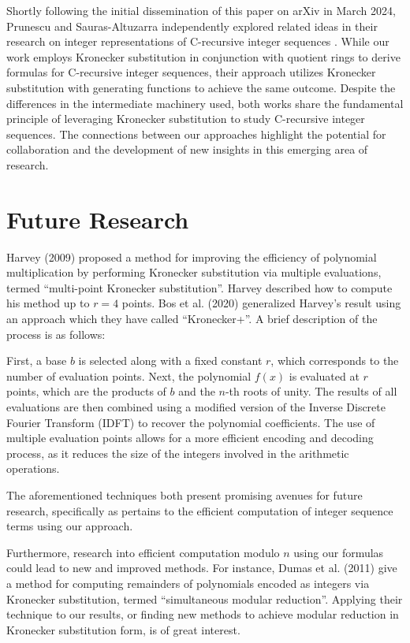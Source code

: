 \documentclass[12pt]{article}
\theoremstyle{plain}
\theoremstyle{definition}
\begin{document}
Shortly following the initial dissemination of this paper on arXiv in March 2024, Prunescu and Sauras-Altuzarra independently explored related ideas in their research on integer representations of C-recursive integer sequences \cite{prunescu2024representation}. While our work employs Kronecker substitution in conjunction with quotient rings to derive formulas for C-recursive integer sequences, their approach utilizes Kronecker substitution with generating functions to achieve the same outcome. Despite the differences in the intermediate machinery used, both works share the fundamental principle of leveraging Kronecker substitution to study C-recursive integer sequences. The connections between our approaches highlight the potential for collaboration and the development of new insights in this emerging area of research.

\section{Future Research} \label{section:futureresearch}
Harvey (2009) \cite{harvey2009kronecker} proposed a method for improving the efficiency of polynomial multiplication by performing Kronecker substitution via multiple evaluations, termed ``multi-point Kronecker substitution''. Harvey described how to compute his method up to $r=4$ points. Bos et al. (2020) \cite{bos2020postquantum} generalized Harvey's result using an approach which they have called ``Kronecker+''. A brief description of the process is as follows:

First, a base $b$ is selected along with a fixed constant $r$, which corresponds to the number of evaluation points. Next, the polynomial $f(x)$ is evaluated at $r$ points, which are the products of $b$ and the $n$-th roots of unity. The results of all evaluations are then combined using a modified version of the Inverse Discrete Fourier Transform (IDFT) to recover the polynomial coefficients. The use of multiple evaluation points allows for a more efficient encoding and decoding process, as it reduces the size of the integers involved in the arithmetic operations.

The aforementioned techniques both present promising avenues for future research, specifically as pertains to the efficient computation of integer sequence terms using our approach.

Furthermore, research into efficient computation modulo $n$ using our formulas could lead to new and improved methods. For instance, Dumas et al. (2011) \cite{dumas2011simulataneous} give a method for computing remainders of polynomials encoded as integers via Kronecker substitution, termed ``simultaneous modular reduction''. Applying their technique to our results, or finding new methods to achieve modular reduction in Kronecker substitution form, is of great interest.
\end{document}
